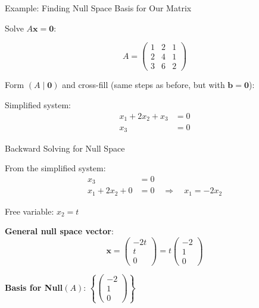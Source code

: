 \documentclass[10pt]{beamer}
\theoremstyle{definition}
\newcommand{\x}[1]{\alert{\textbf{#1}}}
\begin{document}
\begin{frame}{Example: Finding Null Space Basis for Our Matrix}

Solve $A\mathbf{x} = \mathbf{0}$:

$$A = \begin{pmatrix} 1&2&1 \\ 2&4&1 \\ 3&6&2 \end{pmatrix}$$

\vspace{1em}

Form $(A \mid \mathbf{0})$ and cross-fill (same steps as before, but with $\mathbf{b} = \mathbf{0}$):

\vspace{0.5em}

Simplified system:
\begin{align*}
x_1 + 2x_2 + x_3 &= 0 \\
x_3 &= 0
\end{align*}

\end{frame}

\begin{frame}{Backward Solving for Null Space}

From the simplified system:
\begin{align*}
x_3 &= 0 \\
x_1 + 2x_2 + 0 &= 0 \quad \Rightarrow \quad x_1 = -2x_2
\end{align*}

\vspace{1em}

Free variable: $x_2 = t$

\vspace{1em}

\x{General null space vector}:
$$\mathbf{x} = \begin{pmatrix} -2t \\ t \\ 0 \end{pmatrix} = t \begin{pmatrix} -2 \\ 1 \\ 0 \end{pmatrix}$$

\vspace{1em}

\x{Basis for Null}$(A)$: $\left\{ \begin{pmatrix} -2\\1\\0 \end{pmatrix} \right\}$

\end{frame}
\end{document}
